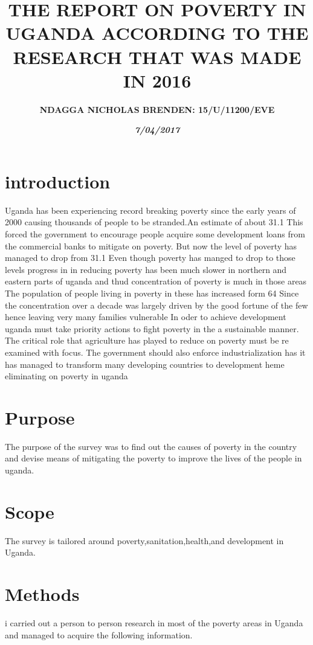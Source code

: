 \documentclass[a4paper,12pt]{report}
\begin{document}
\title{\textbf{THE REPORT ON POVERTY IN UGANDA ACCORDING TO THE RESEARCH THAT WAS MADE IN 2016}}
\author{\textbf{NDAGGA NICHOLAS BRENDEN: 15/U/11200/EVE}}
\date{\textit{\textbf{7/04/2017}}}
\maketitle
\section{introduction}
{\Large Uganda has been experiencing record breaking poverty since the early years of 2000 causing thousands of people to be stranded.An estimate of about 31.1%
This forced the government to encourage people acquire some development loans from the commercial banks to mitigate on poverty.
But now the level of poverty has managed to drop from 31.1%
Even though poverty has manged to drop to those levels progress in in reducing poverty has been much slower in northern and eastern parts of uganda and thud concentration of poverty is much in those areas 
The population of people living in poverty in these has increased form 64%
Since the concentration over a decade was largely driven by the good fortune of the few hence leaving very many families vulnerable
In oder to achieve development uganda must take priority actions to fight poverty in the a sustainable manner.
The critical role that agriculture has played to reduce on poverty must be re examined with focus.
The government should also enforce industrialization has it has managed to transform many developing countries to development heme eliminating on poverty in uganda}
\section{Purpose}
{\Large The purpose of the survey was to find out the causes of poverty in the country
and devise means of mitigating the poverty to improve the lives of the people in uganda.}
\section{Scope}
{\Large The survey is tailored around poverty,sanitation,health,and development in Uganda.}
\section{Methods}
{\Large i carried out a person to person research in most of the poverty areas in Uganda and managed to acquire the following information.}
\end{document}
